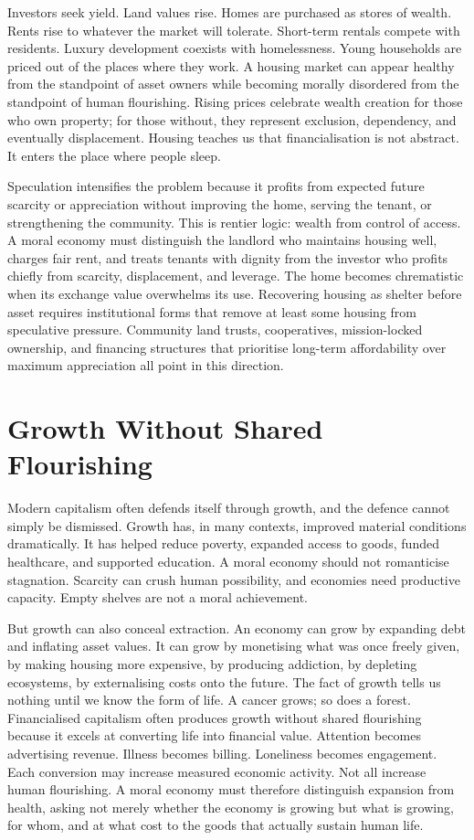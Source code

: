 \documentclass[11pt,a4paper,oneside]{book}
\begin{document}
Investors seek yield. Land values rise. Homes are purchased as stores of wealth. Rents rise to whatever the market will tolerate. Short-term rentals compete with residents. Luxury development coexists with homelessness. Young households are priced out of the places where they work. A housing market can appear healthy from the standpoint of asset owners while becoming morally disordered from the standpoint of human flourishing. Rising prices celebrate wealth creation for those who own property; for those without, they represent exclusion, dependency, and eventually displacement. Housing teaches us that financialisation is not abstract. It enters the place where people sleep.

Speculation intensifies the problem because it profits from expected future scarcity or appreciation without improving the home, serving the tenant, or strengthening the community. This is rentier logic: wealth from control of access. A moral economy must distinguish the landlord who maintains housing well, charges fair rent, and treats tenants with dignity from the investor who profits chiefly from scarcity, displacement, and leverage. The home becomes chrematistic when its exchange value overwhelms its use. Recovering housing as shelter before asset requires institutional forms that remove at least some housing from speculative pressure. Community land trusts, cooperatives, mission-locked ownership, and financing structures that prioritise long-term affordability over maximum appreciation all point in this direction.

\section*{Growth Without Shared Flourishing}

Modern capitalism often defends itself through growth, and the defence cannot simply be dismissed. Growth has, in many contexts, improved material conditions dramatically. It has helped reduce poverty, expanded access to goods, funded healthcare, and supported education. A moral economy should not romanticise stagnation. Scarcity can crush human possibility, and economies need productive capacity. Empty shelves are not a moral achievement.

But growth can also conceal extraction. An economy can grow by expanding debt and inflating asset values. It can grow by monetising what was once freely given, by making housing more expensive, by producing addiction, by depleting ecosystems, by externalising costs onto the future. The fact of growth tells us nothing until we know the form of life. A cancer grows; so does a forest. Financialised capitalism often produces growth without shared flourishing because it excels at converting life into financial value. Attention becomes advertising revenue. Illness becomes billing. Loneliness becomes engagement. Each conversion may increase measured economic activity. Not all increase human flourishing. A moral economy must therefore distinguish expansion from health, asking not merely whether the economy is growing but what is growing, for whom, and at what cost to the goods that actually sustain human life.
\end{document}
